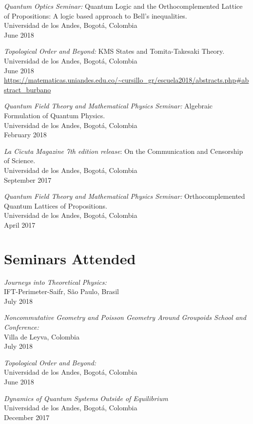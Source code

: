 \documentclass[line,margin]{res}
\begin{document}
\begin{resume}
{\sl Quantum Optics Seminar:} Quantum Logic and the Orthocomplemented Lattice of Propositions: A logic based approach to Bell's inequalities.\\
Universidad de los Andes, Bogotá, Colombia\\
June 2018

{\sl Topological Order and Beyond:} KMS States and Tomita-Takesaki Theory.\\
Universidad de los Andes, Bogotá, Colombia\\
June 2018\\
\url{https://matematicas.uniandes.edu.co/~cursillo_gr/escuela2018/abstracts.php#abstract_burbano}

{\sl Quantum Field Theory and Mathematical Physics Seminar:} Algebraic Formulation of Quantum Physics.\\
Universidad de los Andes, Bogotá, Colombia\\
February 2018

{\sl La Cicuta Magazine 7th edition release}: On the Communication and Censorship of Science.\\
Universidad de los Andes, Bogotá, Colombia\\
September 2017

{\sl Quantum Field Theory and Mathematical Physics Seminar:} Orthocomplemented Quantum Lattices of Propositions.\\
Universidad de los Andes, Bogotá, Colombia\\
April 2017
  
  
\section{Seminars Attended}

{\sl Journeys into Theoretical Physics:}\\
IFT-Perimeter-Saifr, São Paulo, Brasil\\
July 2018

{\sl Noncommutative Geometry and Poisson Geometry Around Groupoids School and Conference:}\\
Villa de Leyva, Colombia\\
July 2018

{\sl Topological Order and Beyond:}\\
Universidad de los Andes, Bogotá, Colombia\\
June 2018

{\sl Dynamics of Quantum Systems Outside of Equilibrium} \\
Universidad de los Andes, Bogotá, Colombia\\
December 2017


\end{resume}
\end{document}

